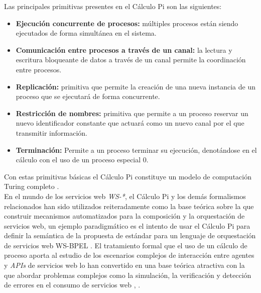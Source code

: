 Las principales primitivas presentes en el C\'alculo Pi son las siguientes:\\

\begin{itemize}
\item \textbf{Ejecuci\'on concurrente de procesos:} m\'ultiples procesos est\'an siendo ejecutados de forma simult\'anea en el sistema.
\item \textbf{Comunicaci\'on entre procesos a trav\'es de un canal:} la lectura y escritura bloqueante de datos a trav\'es de un canal permite la coordinaci\'on entre procesos.
\item \textbf{Replicaci\'on:} primitiva que permite la creaci\'on de una nueva instancia de un proceso que se ejecutar\'a de forma concurrente.
\item \textbf{Restricci\'on de nombres:} primitiva que permite a un proceso reservar un nuevo identificador constante que actuar\'a como un nuevo canal por el que transmitir informaci\'on.
\item \textbf{Terminaci\'on:} Permite a un proceso terminar su ejecuci\'on, denot\'andose en el c\'alculo con el uso de un proceso especial 0.
\end{itemize}

Con estas primitivas b\'asicas el C\'alculo Pi constituye un modelo de computaci\'on Turing completo \cite{milner1992functions}.\\
En el mundo de los servicios web \textit{WS-*}, el C\'alculo Pi y los dem\'as formalismos relacionados han sido utilizados reiteradamente como la base te\'orica sobre la que construir mecanismos automatizados para la composici\'on y la orquestaci\'on de servicios web, un ejemplo paradigm\'atico es el intento de usar el C\'alculo Pi para definir la sem\'antica de la propuesta de est\'andar para un lenguaje de orquestaci\'on de servicios web WS-BPEL \cite{lucchi2007pi}.
El tratamiento formal que el uso de un c\'alculo de proceso aporta al estudio de los escenarios complejos de interacci\'on entre agentes y \textit{APIs} de servicios web lo han convertido en una base te\'orica atractiva con la que abordar problemas complejos como la simulaci\'on, la verificaci\'on y detecci\'on de errores en el consumo de servicios web \cite{narayanan2002simulation}, \cite{bhargavan2004verifying}.\\

